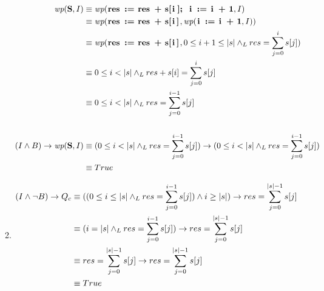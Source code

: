 \begin{enumerate}[label=\alph*)]
\begin{enumerate}[label=\arabic*)]
                    \begin{align*}
                        \wp{S}{I}                   & \equiv \wp{res := res + s[i]; i := i + 1}{I}                                                                           \\
                                                    & \equiv \wp{res := res + s[i]}{\wp{i := i + 1}{I}}                                                                      \\
                                                    & \equiv \wp{res := res + s[i]}{0 \leq i + 1 \leq |s| \yLuego res = \sum_{j=0}^{i} s[j]}                                 \\
                                                    & \equiv 0 \leq i < |s| \yLuego res + s[i] = \sum_{j=0}^{i} s[j]                                                         \\
                                                    & \equiv 0 \leq i < |s| \yLuego res = \sum_{j=0}^{i-1} s[j]                                                              \\\\
                        (I \land B) \Then \wp{S}{I} & \equiv (0 \leq i < |s| \yLuego res = \sum_{j=0}^{i-1} s[j]) \Then (0 \leq i < |s| \yLuego res = \sum_{j=0}^{i-1} s[j]) \\
                                                    & \equiv True
                    \end{align*}

              \item \begin{align*}
                        (I \land \neg B) \rightarrow Q_c & \equiv ((0 \leq i \leq |s| \land _L res = \sum_{j=0}^{i-1} s[j]) \land i \geq |s|) \rightarrow res = \sum_{j=0}^{|s| - 1} s[j] \\
                                                   & \equiv (i = |s| \land _L res = \sum_{j=0}^{i-1} s[j]) \rightarrow res = \sum_{j=0}^{|s| - 1} s[j]                              \\
                                                   & \equiv res = \sum_{j=0}^{|s| - 1} s[j] \rightarrow res = \sum_{j=0}^{|s| - 1} s[j]                                            \\
                                                   & \equiv True
                    \end{align*}
          \end{enumerate}


\end{enumerate}
